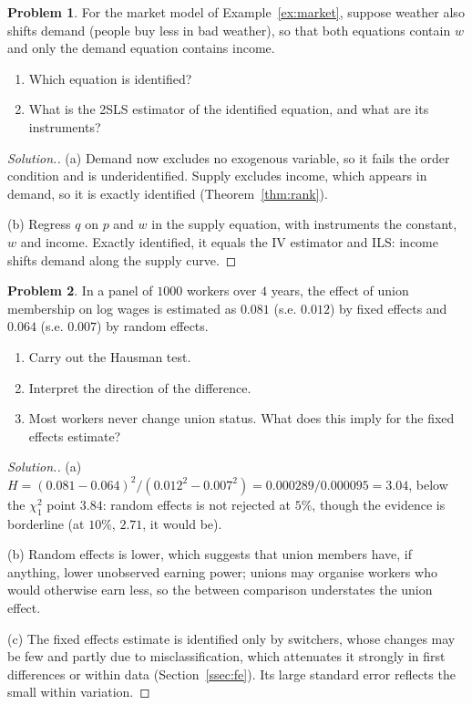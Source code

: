 \documentclass[11pt,a4paper]{article}
\numberwithin{equation}{section}
\theoremstyle{definition}
\newtheorem{problemx}{Problem}[subsection]
\newenvironment{problem}{\begin{problemx}}{\end{problemx}}
\newenvironment{solution}
  {\renewcommand{\qedsymbol}{}\begin{proof}[\textit{Solution}.]}
  {\end{proof}}
\begin{document}
\begin{problem}
For the market model of Example~\ref{ex:market}, suppose weather also shifts demand (people buy less in bad weather), so that both equations contain
$w$ and only the demand equation contains income.
\begin{enumerate}[label=(\alph*)]
\item Which equation is identified?
\item What is the 2SLS estimator of the identified equation, and what are its instruments?
\end{enumerate}
\end{problem}

\begin{solution}
(a) Demand now excludes no exogenous variable, so it fails the order condition and is underidentified. Supply excludes income, which appears in
demand, so it is exactly identified (Theorem~\ref{thm:rank}).

(b) Regress $q$ on $p$ and $w$ in the supply equation, with instruments the constant, $w$ and income. Exactly identified, it equals the IV estimator and ILS:
income shifts demand along the supply curve.
\end{solution}

\begin{problem}
In a panel of $1000$ workers over $4$ years, the effect of union membership on log wages is estimated as $0.081$ (s.e. $0.012$) by fixed effects and $0.064$ (s.e. $0.007$) by
random effects.
\begin{enumerate}[label=(\alph*)]
\item Carry out the Hausman test.
\item Interpret the direction of the difference.
\item Most workers never change union status. What does this imply for the fixed effects estimate?
\end{enumerate}
\end{problem}

\begin{solution}
(a) $H = (0.081 - 0.064)^2/(0.012^2 - 0.007^2) = 0.000289/0.000095 = 3.04$, below the $\chi^2_1$ point $3.84$: random effects is not rejected at $5\%$, though the evidence is borderline (at $10\%$,
$2.71$, it would be).

(b) Random effects is lower, which suggests that union members have, if anything, lower unobserved earning power; unions may organise workers who
would otherwise earn less, so the between comparison understates the union effect.

(c) The fixed effects estimate is identified only by switchers, whose changes may be few and partly due to misclassification, which attenuates it
strongly in first differences or within data (Section~\ref{ssec:fe}). Its large standard error reflects the small within variation.
\end{solution}
\end{document}
